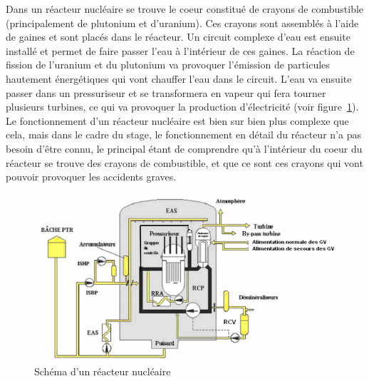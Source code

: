 Dans un réacteur nucléaire se trouve le coeur constitué de crayons de combustible (principalement de plutonium et d'uranium). Ces crayons sont assemblés à l'aide de gaines et sont placés dans le réacteur. Un circuit complexe d'eau est ensuite installé et permet de faire passer l'eau à l'intérieur de ces gaines. La réaction de fission de l'uranium et du plutonium va provoquer l'émission de particules hautement énergétiques qui vont chauffer l'eau dans le circuit. L'eau va ensuite passer dans un pressuriseur et se transformera en vapeur qui fera tourner plusieurs turbines, ce qui va provoquer la production d'électricité (voir figure~\ref{reacteur}). Le fonctionnement d'un 
réacteur nucléaire est bien sur bien plus complexe que cela, mais dans le cadre du stage, le fonctionnement en détail du réacteur n'a pas besoin d'être connu, le principal étant de comprendre qu'à l'intérieur du coeur du réacteur se trouve des crayons de combustible, et que ce sont ces crayons qui vont pouvoir provoquer les accidents graves.\\

\begin{figure}[h]
\includegraphics[scale=0.5]{reacteur.png}
\caption{Schéma d'un réacteur nucléaire}
\label{reacteur}
\end{figure}



